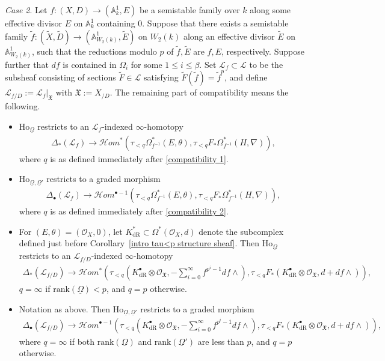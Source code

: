 \documentclass[12pt, a4paper]{article}
\begin{document}
\emph{Case 2}.
Let $f : (X, D) \to (\mathbb{A}^1_k, E)$ be a semistable family over $k$ along some effective divisor $E$ on $\mathbb{A}^1_k$ containing $0$. Suppose that there exists a semistable family $\tilde{f} : (\tilde{X}, \tilde{D}) \to (\mathbb{A}^1_{W_2(k)}, \tilde{E})$ on $W_2(k)$ along an effective divisor $\tilde{E}$ on $\mathbb{A}^1_{W_2(k)}$, such that the reductions modulo $p$ of $\tilde{f}, \tilde{E}$ are $f, E$, respectively. Suppose further that $df$ is contained in $\Omega_i$ for some $1 \leq i \leq \beta$. Set $\mathcal{L}_f \subset \mathcal{L}$ to be the subsheaf consisting of sections $\tilde{F} \in \mathcal{L}$ satisfying $\tilde{F}(\tilde{f}) = \tilde{f}^p$, and define
$\mathcal{L}_{f/D} := \mathcal{L}_f|_{\mathfrak{X}}$ with $\mathfrak{X} := X_{/D}$.
 The remaining part of compatibility means the following.
\begin{itemize}
    \item $\mathrm{Ho}_{\underline \Omega}$ restricts to an $\mathcal L_f$-indexed $\infty$-homotopy
    \begin{eqnarray*}
    \Delta_*(\mathcal L_f)\to\mathcal Hom^*(\tau_{<q}\Omega^*_{f^{-1}}(E,\theta),\tau_{<q}F_*\Omega^*_{f^{-1}}(H,\nabla)),
    \end{eqnarray*}  
    where \( q \) is as defined immediately after \eqref{compatibility 1}.
   \item $\mathrm{Ho}_{\underline\Omega,\underline\Omega'}$ restricts to a graded morphism
   \begin{eqnarray*}
\Delta_\bullet(\mathcal L_f)\to\mathcal Hom^{\bullet-1}(\tau_{<q}\Omega^*_{f^{-1}}(E,\theta),\tau_{<q}F_*\Omega^*_{f^{-1}}(H,\nabla)),
    \end{eqnarray*}
    where \( q \) is as defined immediately after \eqref{compatibility 2}.
  \item For $(E, \theta) = (\mathcal{O}_X, 0)$, let $K^*_{\mathrm{dR}} \subset \Omega^*(\mathcal{O}_X, d)$ denote the subcomplex defined just before Corollary~\ref{intro tau<p structure sheaf}. Then
  $\mathrm{Ho}_{\underline \Omega}$ restricts to an $\mathcal L_{f/D}$-indexed $\infty$-homotopy
    \begin{eqnarray*}
    \Delta_*(\mathcal L_{f/D})\to\mathcal Hom^*(\tau_{<q}(K^\bullet_\mathrm{dR}\otimes\mathcal O_{\mathfrak X},-\sum_{i=0}^\infty f^{p^i-1}df\wedge),\tau_{<q}F_*(K^\bullet_\mathrm{dR}\otimes\mathcal O_{\mathfrak X},d+df\wedge)),
    \end{eqnarray*}  
    $q = \infty$ if $\mathrm{rank}(\underline\Omega) < p $, and $q = p$ otherwise.
    \item Notation as above. Then $\mathrm{Ho}_{\underline \Omega,\underline\Omega'}$ restricts to a graded morphism
    \begin{eqnarray*}
    \Delta_\bullet(\mathcal L_{f/D})\to\mathcal Hom^{\bullet-1}(\tau_{<q}(K^\bullet_\mathrm{dR}
    \otimes\mathcal O_{\mathfrak X},-\sum_{i=0}^\infty f^{p^i-1}df\wedge),\tau_{<q}F_*(K^\bullet_\mathrm{dR}
    \otimes\mathcal O_{\mathfrak X},d+df\wedge)),
    \end{eqnarray*}   
    where $q = \infty$ if both $\mathrm{rank}(\underline{\Omega})$ and $\mathrm{rank}(\underline{\Omega}')$ are less than $p$, and $q = p$ otherwise. 
    \end{itemize}
\end{document}
